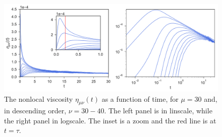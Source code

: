 \documentclass[b5paper,openright,10pt]{book}
\begin{document}
\begin{figure}[h!]
  \centering
\includegraphics[width=\linewidth]{Etat-PBC}
\caption[The nonlocal viscosity as a function of time for an unconfined fluid]{The nonlocal viscosity $\eta_{\mu\nu}(t)$ as a function of time, for $\mu=30$ and, in descending order, $\nu=30-40$. The left panel is in linscale, while the right panel in logscale. The inset is a zoom and the red line is at $t=\tau$.}
\label{fig:Etat-PBC}
\end{figure}
\end{document}
